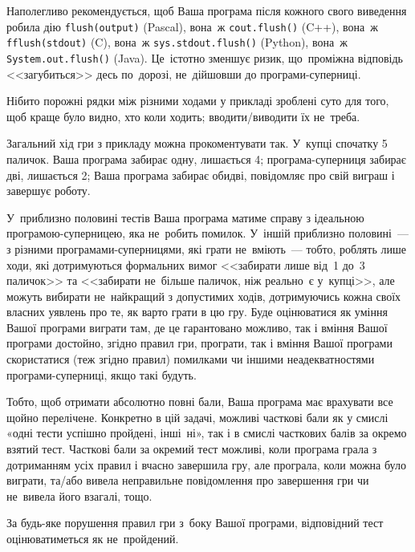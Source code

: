 Наполегливо рекомендується, щоб Ваша програма після кожного свого виведення 
робила дію \verb"flush(output)" (Pascal), 
вона~ж \verb"cout.flush()" (C++), 
вона~ж \verb"fflush(stdout)" (C), 
вона~ж \verb"sys.stdout.flush()" (Python),
вона~ж \verb"System.out.flush()" (Java).
Це~істотно зменшує ризик, 
що~проміжна відповідь <<загубиться>> десь по~дорозі, 
не~дійшовши до програми-суперниці.


\Example

\begin{example}
\end{example}

\Note
Нібито порожні рядки між різними ходами у прикладі зроблені суто для того, щоб краще було видно, хто коли ходить; вводити/виводити їх не~треба.

Загальний хід гри з прикладу можна прокоментувати так. У~купці спочатку 5 паличок. Ваша програма забирає одну, 
лишається 4; програма-суперниця забирає дві, лишається 2;
Ваша програма забирає обидві, повідомляє про свій виграш і завершує роботу.


\Scoring
У~приблизно половині тестів Ваша програма матиме справу з ідеальною програмою-суперницею, яка не~робить помилок.
У~іншій приблизно половині~--- з різними програмами-суперницями, які грати не~вміють~--- тобто, роблять лише ходи, які дотримуються формальних вимог <<забирати лише від~1 до~3 паличок>> та <<забирати не~більше паличок, ніж реально~є у~купці>>, 
але можуть вибирати не~найкращий з допустимих ходів, дотримуючись кожна своїх власних уявлень про те, як варто грати в цю гру.
Буде оцінюватися 
як уміння Вашої програми виграти там, де це гарантовано можливо,
так і вміння Вашої програми достойно, згідно правил гри, програти, 
так і вміння Вашої програми скористатися (теж згідно правил) помилками чи іншими неадекватностями програми-суперниці, якщо такі будуть.

Тобто, щоб отримати абсолютно повні бали, Ваша програма має врахувати все щойно перелічене. 
Конкретно в цій задачі, можливі часткові бали як у смислі «одні тести успішно пройдені, інші~ні», так і в смислі часткових балів за окремо взятий тест. Часткові бали за окремий тест можливі, коли програма грала з дотриманням усіх правил і вчасно завершила гру, але програла, коли можна було виграти, та/або вивела неправильне повідомлення про завершення гри чи не~вивела його взагалі, тощо.

За будь-яке порушення правил гри з~боку Вашої програми, відповідний тест оцінюватиметься як не~пройдений.


